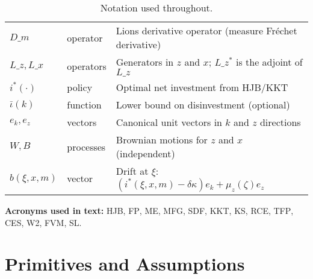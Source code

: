 \documentclass[11pt,letterpaper,oneside]{article}
\numberwithin{equation}{section}
\newcommand{\ac}[1]{\textsc{#1}}
\newcommand{\printacronyms}{}
\newcommand{\1}{\mathbf{1}}
\newcommand{\Lz}{L\_z}
\newcommand{\Lx}{L\_x}
\newcommand{\Lzadj}{L\_z^{\!*}}
\newcommand{\Dm}{D\_m}
\newcommand{\kbar}{\bar\iota}
\begin{document}
\begin{table}[!ht]
\begin{tabular}{@{} l l p{}}
$\Dm$ & operator & Lions derivative operator (measure Fréchet derivative) \\
$\Lz,\Lx$ & operators & Generators in $z$ and $x$; $\Lzadj$ is the adjoint of $\Lz$ \\
$i^*(\cdot)$ & policy & Optimal net investment from HJB/KKT \\
$\kbar(k)$ & function & Lower bound on disinvestment (optional) \\
$e_k,e_z$ & vectors & Canonical unit vectors in $k$ and $z$ directions \\
$W,B$ & processes & Brownian motions for $z$ and $x$ (independent) \\
$b(\xi,x,m)$ & vector & Drift at $\xi$: $(i^*(\xi,x,m)-\delta\kappa)e_k+\mu_z(\zeta)e_z$ \\
\bottomrule
\end{tabular}
\caption{Notation used throughout.}
\end{table}


\medskip
\noindent\textbf{Acronyms used in text:} \ac{HJB}, \ac{FP}, \ac{ME}, \ac{MFG}, \ac{SDF}, \ac{KKT}, \ac{KS}, \ac{RCE}, \ac{TFP}, \ac{CES}, \ac{W2}, \ac{FVM}, \ac{SL}.
\medskip

\printacronyms

\section{Primitives and Assumptions}
\end{document}
